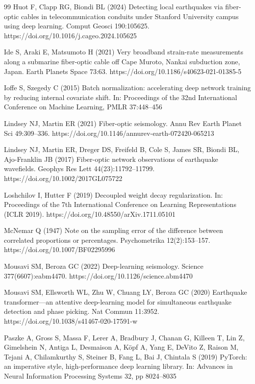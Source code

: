 \begin{thebibliography}{99}
Huot F, Clapp RG, Biondi BL (2024) Detecting local earthquakes via fiber-optic cables in telecommunication conduits under Stanford University campus using deep learning. Comput Geosci 190:105625. https://doi.org/10.1016/j.cageo.2024.105625

Ide S, Araki E, Matsumoto H (2021) Very broadband strain-rate measurements along a submarine fiber-optic cable off Cape Muroto, Nankai subduction zone, Japan. Earth Planets Space 73:63. https://doi.org/10.1186/s40623-021-01385-5

Ioffe S, Szegedy C (2015) Batch normalization: accelerating deep network training by reducing internal covariate shift. In: Proceedings of the 32nd International Conference on Machine Learning, PMLR 37:448--456

Lindsey NJ, Martin ER (2021) Fiber-optic seismology. Annu Rev Earth Planet Sci 49:309--336. https://doi.org/10.1146/annurev-earth-072420-065213

Lindsey NJ, Martin ER, Dreger DS, Freifeld B, Cole S, James SR, Biondi BL, Ajo-Franklin JB (2017) Fiber-optic network observations of earthquake wavefields. Geophys Res Lett 44(23):11792--11799. https://doi.org/10.1002/2017GL075722

Loshchilov I, Hutter F (2019) Decoupled weight decay regularization. In: Proceedings of the 7th International Conference on Learning Representations (ICLR 2019). https://doi.org/10.48550/arXiv.1711.05101

McNemar Q (1947) Note on the sampling error of the difference between correlated proportions or percentages. Psychometrika 12(2):153--157. https://doi.org/10.1007/BF02295996

Mousavi SM, Beroza GC (2022) Deep-learning seismology. Science 377(6607):eabm4470. https://doi.org/10.1126/science.abm4470

Mousavi SM, Ellsworth WL, Zhu W, Chuang LY, Beroza GC (2020) Earthquake transformer---an attentive deep-learning model for simultaneous earthquake detection and phase picking. Nat Commun 11:3952. https://doi.org/10.1038/s41467-020-17591-w

Paszke A, Gross S, Massa F, Lerer A, Bradbury J, Chanan G, Killeen T, Lin Z, Gimelshein N, Antiga L, Desmaison A, K\"opf A, Yang E, DeVito Z, Raison M, Tejani A, Chilamkurthy S, Steiner B, Fang L, Bai J, Chintala S (2019) PyTorch: an imperative style, high-performance deep learning library. In: Advances in Neural Information Processing Systems 32, pp 8024--8035


\end{thebibliography}
